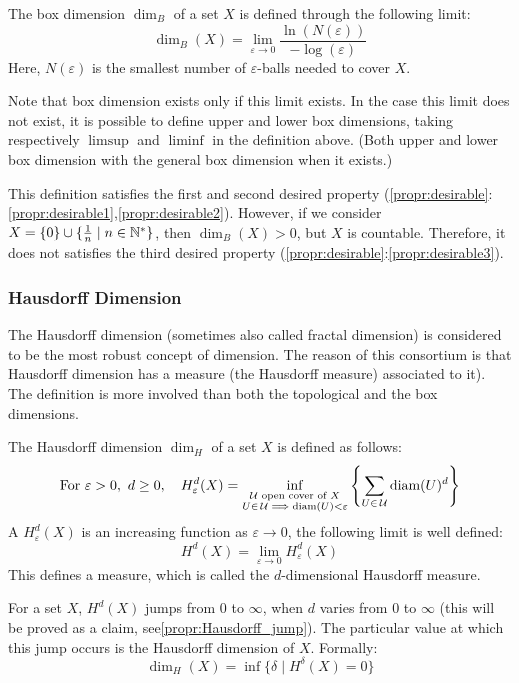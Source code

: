 \begin{definition}\label{def:boxDimension}
	The box dimension $\dim_B$ of a set $X$ is defined through the following limit:
	$$
	\dim_B(X) = \lim_{\varepsilon \to 0} \frac{\ln(N(\varepsilon))}{-\log(\varepsilon)}
	$$
	Here, $N(\varepsilon)$ is the smallest number of $\varepsilon$-balls needed to cover $X$.
	
	Note that box dimension exists only if this limit exists.
	In the case this limit does not exist, it is possible to define upper and lower box dimensions, taking respectively $\limsup$ and $\liminf$ in the definition above.
	(Both upper and lower box dimension with the general box dimension when it exists.) 
\end{definition}

This definition satisfies the first and second desired property (\ref{propr:desirable}:\ref{propr:desirable1},\ref{propr:desirable2}).
However, if we consider $X = \{0\} \cup \{\frac{1}{n} \mid n \in \mathbb{N}^*\}$, then $\dim_B(X) > 0$, but $X$ is countable.
Therefore, it does not satisfies the third desired property (\ref{propr:desirable}:\ref{propr:desirable3}).

\subsubsection{Hausdorff Dimension}
The Hausdorff dimension (sometimes also called fractal dimension) is considered to be the most robust concept of dimension.
The reason of this consortium is that Hausdorff dimension has a measure (the Hausdorff measure) associated to it).
The definition is more involved than both the topological and the box dimensions.

\begin{definition}\label{def:HausdorffDimension}
	The Hausdorff dimension $\dim_H$ of a set $X$ is defined as follows:
	$$\text{For } \varepsilon > 0, \ d \geq 0, \quad
	H_{\varepsilon}^d(X) = 
	\inf_{\substack{\mathcal{U} \text{ open cover of } X\\
			U \in \, \mathcal{U} \implies \text{diam}(U) < \varepsilon}}
		\left\lbrace \sum_{U \in \, \mathcal{U}} \text{diam}(U)^d \right\rbrace
	$$
	A $H_{\varepsilon}^d(X)$ is an increasing function as $\varepsilon \to 0$, the following limit is well defined:
	$$
	H^d(X) = \lim_{\varepsilon \to 0} H_{\varepsilon}^d(X)
	$$
	This defines a measure, which is called the $d$-dimensional Hausdorff measure.
	
	For a set $X$, $H^d(X)$ jumps from $0$ to $\infty$, when $d$ varies from $0$ to $\infty$ (this will be proved as a claim, see\ref{propr:Hausdorff_jump}).
	The particular value at which this jump occurs is the Hausdorff dimension of $X$. Formally:
	$$
	\dim_H(X) = \inf \{ \delta \mid H^{\delta}(X) = 0 \}
	$$
\end{definition}

